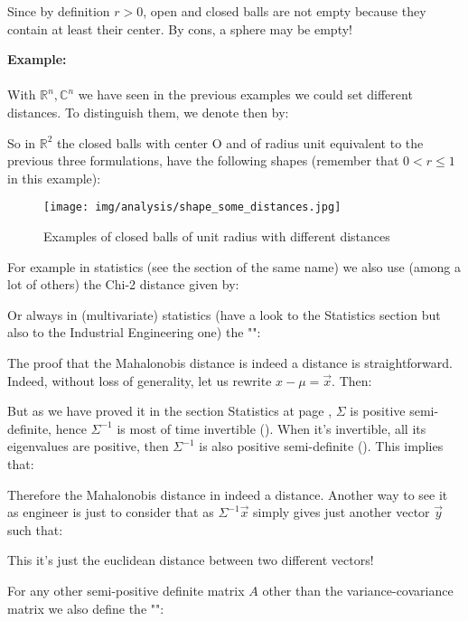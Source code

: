 	\begin{tcolorbox}[title=Remark,colframe=black,arc=10pt]
	Since by definition $r>0$, open and closed balls are not empty because they contain at least their center. By cons, a sphere may be empty!
	\end{tcolorbox}
	\begin{tcolorbox}[colframe=black,colback=white,sharp corners]
	\textbf{{\Large {}}Example:}\\\\
	With $\mathbb{R}^n,\mathbb{C}^n$ we have seen in the previous examples we could set different distances. To distinguish them, we denote then by:
	
	So in $\mathbb{R}^2$ the closed balls with center O and of radius unit equivalent to the previous three formulations, have the following shapes (remember that $0<r\leq 1$ in this example):
	\begin{figure}[H]
		\centering
		\texttt{[image: img/analysis/shape\_some\_distances.jpg]}
		\caption{Examples of closed balls of unit radius with different distances}
	\end{figure}
	\end{tcolorbox}
	For example in statistics (see the section of the same name) we also use (among a lot of others) the Chi-2 distance given by:
	
	Or always in (multivariate) statistics (have a look to the Statistics section but also to the Industrial Engineering one) the ""\label{Mahalanobis distance}:
	
	\begin{tcolorbox}[title=Remarks,colframe=black,arc=10pt]
	The proof that the Mahalonobis distance is indeed a distance is straightforward. Indeed, without loss of generality, let us rewrite $x-\mu=\vec{x}$. Then:
	
	But as we have proved it in the section Statistics at page \pageref{positive semi-definitiveness of covariance matrix}, $\Sigma$ is positive semi-definite, hence $\Sigma^{-1}$ is most of time invertible (). When it's invertible, all its eigenvalues are positive, then $\Sigma^{-1}$ is also positive semi-definite (). This implies that:
	
	Therefore the Mahalonobis distance in indeed a distance. Another way to see it as engineer is just to consider that as $\Sigma^{-1}\vec{x}$ simply gives just another vector $\vec{y}$ such that:
	
	This it's just the euclidean distance between two different vectors!
	\end{tcolorbox}	
	For any other semi-positive definite matrix $A$ other than the variance-covariance matrix we also define the ""\label{elliptic metric}:
	
